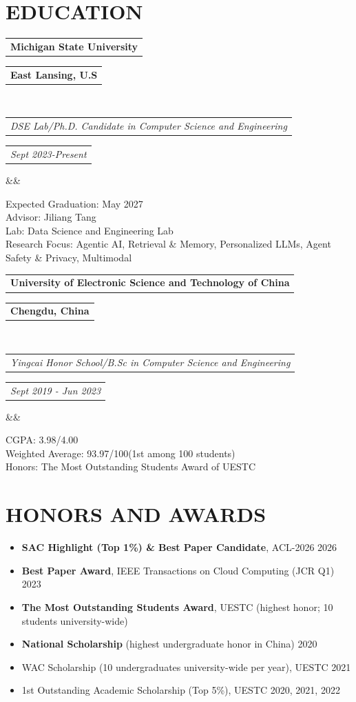 \documentclass[11pt,a4paper,roman]{moderncv}        %
\makeatletter
\newcommand*{\customcventry}[7][.25em]{
  \begin{tabular}{@{}l} 
    {\bfseries #4}
  \end{tabular}
  \hfill%
  \begin{tabular}{l@{}}
     {\bfseries #5}
  \end{tabular} \\
  \begin{tabular}{@{}l} 
    {\itshape #3}
  \end{tabular}
  \hfill%
  \begin{tabular}{l@{}}
     {\itshape #2}
  \end{tabular}
  \ifx&#7&%
  \else{\\%
    \begin{minipage}{\maincolumnwidth}%
      \small#7%
    \end{minipage}}\fi%
  \par\addvspace{#1}}
\makeatother
\begin{document}
\section{EDUCATION}

{\customcventry{Sept 2023-Present}{
DSE Lab/Ph.D. Candidate in Computer Science and Engineering   }{Michigan State University}{East Lansing, U.S}{}{}}
Expected Graduation: May 2027\\
Advisor: Jiliang Tang\\
Lab: Data Science and Engineering Lab\\
Research Focus: Agentic AI, Retrieval \& Memory, Personalized LLMs, Agent Safety \& Privacy, Multimodal

{\customcventry{Sept 2019 - Jun 2023}{
Yingcai Honor School/B.Sc in Computer Science and Engineering   }{University of Electronic Science and Technology of China }{Chengdu, China}{}{}}

CGPA: 3.98/4.00  \\
Weighted Average: 93.97/100(1st among 100 students)\\
Honors: The Most Outstanding Students Award of UESTC



\section{HONORS AND AWARDS}
\begin{minipage}{\maincolumnwidth}%
	\small{
    	\begin{itemize}
          \item \textbf{SAC Highlight (Top 1\%) \& Best Paper Candidate}, ACL-2026 \hfill 2026
          \item \textbf{Best Paper Award}, IEEE Transactions on Cloud Computing (JCR Q1) \hfill 2023
          \item \textbf{The Most Outstanding Students Award}, UESTC (highest honor; 10 students university-wide)
          \item \textbf{National Scholarship} (highest undergraduate honor in China) \hfill 2020
          \item WAC Scholarship (10 undergraduates university-wide per year), UESTC \hfill 2021
          \item 1st Outstanding Academic Scholarship (Top 5\%), UESTC \hfill 2020, 2021, 2022
		\end{itemize}}%
\end{minipage}%
\end{document}

